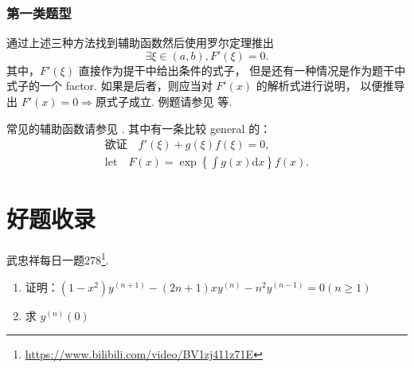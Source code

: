 \subsubsection{第一类题型}

通过上述三种方法找到辅助函数然后使用罗尔定理推出
\[
    \exists \xi \in \left(a, b\right), F'(\xi) = 0.
\]
其中，$F'(\xi)$ 直接作为提干中给出条件的式子，
但是还有一种情况是作为题干中式子的一个 factor.
如果是后者，则应当对 $F'(x)$ 的解析式进行说明，
以便推导出 $F'(x) = 0 \Rightarrow \mbox{原式子成立}$.
例题请参见 \cite[page 82, pdf 93, example 2]{we} 等.

常见的辅助函数请参见 \cite[page 83, pdf 94]{we}.
其中有一条比较 general 的：
\begin{align*}
    \mbox{欲证}\quad f'(\xi) + g(\xi) f(\xi) = 0,  \\
    \mbox{let} \quad 
    F(x) = \exp \left\{\int g(x) \mbox{d}x\right\} f(x).
\end{align*}

\section{好题收录}

\begin{example}
    武忠祥每日一题278\footnote{\url{https://www.bilibili.com/video/BV1zj411z71E}}.
    \begin{enumerate}
        \item 证明：$(1-x^2) y^{(n+1)} - (2n+1) xy^{(n)} - n^2 y^{(n - 1)} = 0 (n \geq 1)$
        \item 求 $y^{(n)}(0)$
    \end{enumerate}
\end{example}

